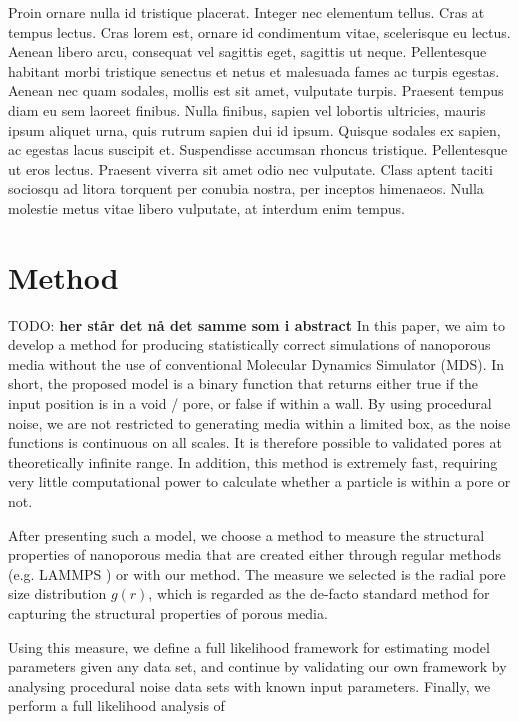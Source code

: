 \documentclass[aps,pre,twocolumn,letterpaper,floatfix,showpacs]{revtex4}
\newcommand{\todo}[1]{ {\color{Magenta} TODO: \color{Blue} \textbf{#1} }}
\begin{document}
Proin ornare nulla id tristique placerat. Integer nec elementum tellus. Cras at tempus lectus. Cras lorem est, ornare id condimentum vitae, scelerisque eu lectus. Aenean libero arcu, consequat vel sagittis eget, sagittis ut neque. Pellentesque habitant morbi tristique senectus et netus et malesuada fames ac turpis egestas. Aenean nec quam sodales, mollis est sit amet, vulputate turpis. Praesent tempus diam eu sem laoreet finibus. Nulla finibus, sapien vel lobortis ultricies, mauris ipsum aliquet urna, quis rutrum sapien dui id ipsum. Quisque sodales ex sapien, ac egestas lacus suscipit et. Suspendisse accumsan rhoncus tristique. Pellentesque ut eros lectus. Praesent viverra sit amet odio nec vulputate. Class aptent taciti sociosqu ad litora torquent per conubia nostra, per inceptos himenaeos. Nulla molestie metus vitae libero vulputate, at interdum enim tempus.

\section{Method}
\todo{her står det nå det samme som i abstract}
In this paper, we aim to develop a method for producing statistically correct simulations of nanoporous media without the use of conventional Molecular Dynamics Simulator (MDS). In short, the proposed model is a binary function that returns either true if the input position is in a void / pore, or false if within a wall. By using procedural noise, we are not restricted to generating media within a limited box, as the noise functions is continuous on all scales. It is therefore possible to validated pores at theoretically infinite range. In addition, this method is extremely fast, requiring very little computational power to calculate whether a particle is within a pore or not. 

After presenting such a model, we choose a method to measure the structural properties of nanoporous media that are created either through regular methods (e.g. LAMMPS \cite{plimpton1995fast}) or with our method. The measure we selected is the radial pore size distribution $g(r)$, which is regarded as the de-facto standard method for capturing the structural properties of porous media. 

Using this measure, we define a full likelihood framework for estimating model parameters given any data set, and continue by validating our own framework by analysing procedural noise data sets with known input parameters. Finally, we perform a full likelihood analysis of  
\end{document}
